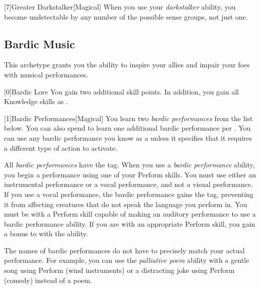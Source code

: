         [7]{Greater Darkstalker}[Magical] When you use your \textit{darkstalker} ability, you become undetectable by any number of the possible sense groups, not just one.

    \newpage
    \subsection{Bardic Music}
        This archetype grants you the ability to inspire your allies and impair your foes with musical performances.

        [0]{Bardic Lore} You gain two additional skill points.
        In addition, you gain all Knowledge skills as .

        [1]{Bardic Performances}[Magical]
        You learn two \textit{bardic performances} from the list below.
        You can also spend  to learn one additional bardic performance per .
        You can use any bardic performance you know as a  unless it specifies that it requires a different type of action to activate.

        All \textit{bardic performances} have the  tag.
        When you use a \textit{bardic performance} ability, you begin a performance using one of your Perform skills.
        You must use either an instrumental performance or a vocal performance, and not a visual performance.
        If you use a vocal performance, the bardic performance gains the  tag, preventing it from affecting creatures that do not speak the language you perform in.
        You must be  with a Perform skill capable of making an auditory performance to use a bardic performance ability.
        If you are  with an appropriate Perform skill, you gain a  bonus to  with the ability.

        The names of bardic performances do not have to precisely match your actual performance.
        For example, you can use the \textit{palliative poem} ability with a gentle song using Perform (wind instruments) or a distracting joke using Perform (comedy) instead of a poem.

